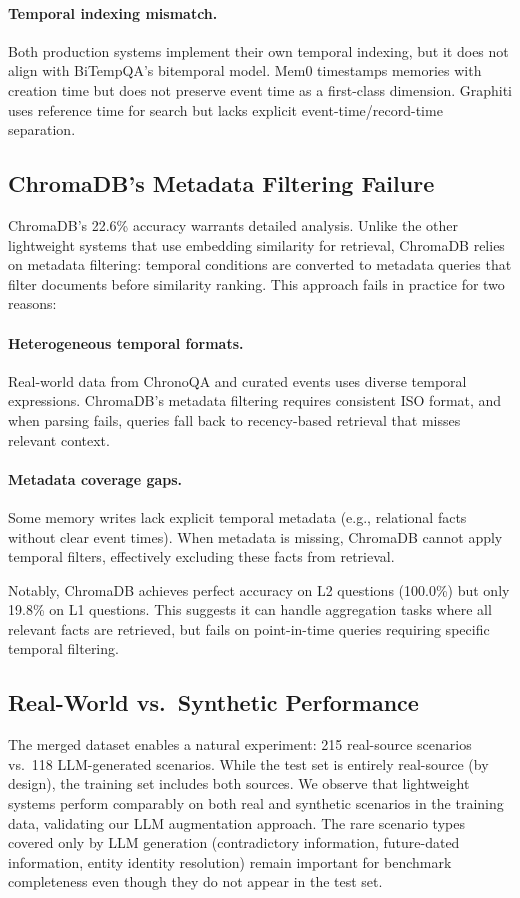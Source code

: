 \paragraph{Temporal indexing mismatch.}
Both production systems implement their own temporal indexing, but it does not align with BiTempQA's bitemporal model.
Mem0 timestamps memories with creation time but does not preserve event time as a first-class dimension.
Graphiti uses reference time for search but lacks explicit event-time/record-time separation.

\subsection{ChromaDB's Metadata Filtering Failure}
ChromaDB's 22.6\% accuracy warrants detailed analysis.
Unlike the other lightweight systems that use embedding similarity for retrieval, ChromaDB relies on metadata filtering: temporal conditions are converted to metadata queries that filter documents before similarity ranking.
This approach fails in practice for two reasons:

\paragraph{Heterogeneous temporal formats.}
Real-world data from ChronoQA and curated events uses diverse temporal expressions. ChromaDB's metadata filtering requires consistent ISO format, and when parsing fails, queries fall back to recency-based retrieval that misses relevant context.

\paragraph{Metadata coverage gaps.}
Some memory writes lack explicit temporal metadata (e.g., relational facts without clear event times). When metadata is missing, ChromaDB cannot apply temporal filters, effectively excluding these facts from retrieval.

Notably, ChromaDB achieves perfect accuracy on L2 questions (100.0\%) but only 19.8\% on L1 questions. This suggests it can handle aggregation tasks where all relevant facts are retrieved, but fails on point-in-time queries requiring specific temporal filtering.

\subsection{Real-World vs.\ Synthetic Performance}
The merged dataset enables a natural experiment: 215 real-source scenarios vs.\ 118 LLM-generated scenarios.
While the test set is entirely real-source (by design), the training set includes both sources.
We observe that lightweight systems perform comparably on both real and synthetic scenarios in the training data, validating our LLM augmentation approach.
The rare scenario types covered only by LLM generation (contradictory information, future-dated information, entity identity resolution) remain important for benchmark completeness even though they do not appear in the test set.

